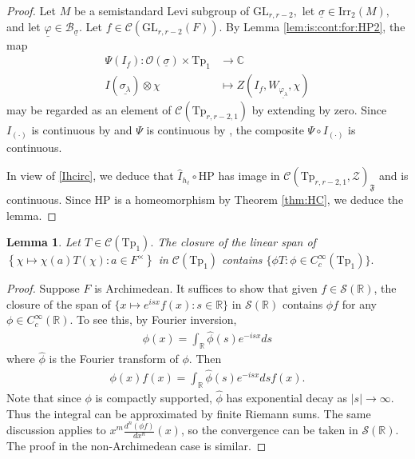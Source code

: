 \documentclass[12pt]{amsart}
\newtheorem{lem}[thm]{Lemma}
\theoremstyle{remark}
\numberwithin{equation}{section}
\newcommand{\GL}{\mathrm{GL}}
\newcommand{\lto}{\longrightarrow}
\newcommand{\CC}{\mathbb{C}}
\newcommand{\RR}{\mathbb{R}}
\theoremstyle{definition}
\numberwithin{equation}{subsection}
\begin{document}
\begin{proof}
Let $M$ be a semistandard Levi subgroup of $\GL_{r,r-2},$ let $\underline{\sigma} \in \mathrm{Irr}_2(M),$ and let $\underline{\varphi} \in \mathcal{B}_{\underline{\sigma}}.$  Let $f \in \mathcal{C}(\GL_{r,r-2}(F)).$  By Lemma \ref{lem:is:cont:for:HP2}, the map
\begin{align*}
\Psi(I_f):\mathcal{O}(\underline{\sigma}) \times \mathrm{Tp}_1 &\lto \CC\\
I(\underline{\sigma_{\lambda}}) \otimes \chi &\longmapsto Z(I_f,W_{\underline{\varphi_{\lambda}}},\chi)
\end{align*}
 may be regarded as an element of $\mathcal{C}(\mathrm{Tp}_{r,r-2,1})$ by extending by zero.   
Since  
 $I_{(\cdot)}$ is continuous by  and $\Psi$ is continuous by , the composite $\Psi \circ I_{(\cdot)}$
 is continuous.


In view of \eqref{Ihcirc}, we deduce that $\widehat{I}_{h_\ell} \circ \mathrm{HP}$ has image in $\mathcal{C}(\mathrm{Tp}_{r,r-2,1},\mathcal{Z})_{\mathfrak{F}}$ and is continuous.  Since $\mathrm{HP}$ is a homeomorphism by Theorem \ref{thm:HC}, we deduce the lemma. 
\end{proof}




\begin{lem}\label{lem:approx}
Let $T \in \mathcal{C}(\mathrm{Tp}_1).$  The closure of the linear span of $\left\{\chi\mapsto   \chi(a)T(\chi):  a\in F^\times\right\}$ in $\mathcal{C}(\mathrm{Tp}_1)$ contains $\{\phi T:\phi \in C_c^\infty(\mathrm{Tp}_1)\}.$
\end{lem}

\begin{proof}
Suppose $F$ is Archimedean. It suffices to show that given $f\in \mathcal{S}(\RR)$, the closure of the span of $
        \{ x\mapsto e^{isx}f(x): s\in \RR\}$
    in $\mathcal{S}(\RR)$ contains $\phi f$ for any $\phi\in C^\infty_c(\RR)$. To see this, by Fourier inversion, 
    \begin{align*}
        \phi(x)=\int_{\RR} \widehat{\phi}(s)e^{-isx}ds
    \end{align*}
    where $\widehat{\phi}$ is the Fourier transform of $\phi$. Then
    \begin{align*}
        \phi(x)f(x)=\int_{\RR} \widehat{\phi}(s)e^{-isx}dsf(x).
    \end{align*}
    Note that since $\phi$ is compactly supported, $\widehat{\phi}$ has exponential decay as $|s|\to \infty$. Thus the integral can be approximated by finite Riemann sums. The same discussion applies to  $x^m\frac{d^n(\phi f)}{dx^n}(x)$, so the convergence can be taken in $\mathcal{S}(\RR).$  The proof in the non-Archimedean case is similar.
\end{proof}
\end{document}
